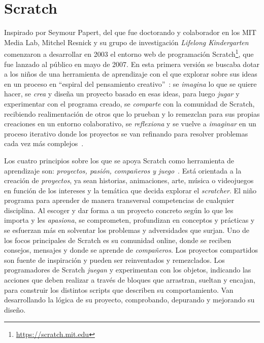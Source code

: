 \documentclass[a4paper, 12pt]{book}
\begin{document}
\section{Scratch}
\label{sec:scratch}

Inspirado por Seymour Papert, del que fue doctorando y colaborador en los MIT Media Lab, Mitchel Resnick y su grupo de investigación \emph{Lifelong Kindergarten} comenzaron a desarrollar en 2003 el entorno web de programación Scratch\footnote{\url{https://scratch.mit.edu}}, que fue lanzado al público en mayo de 2007. En esta primera versión se buscaba dotar a los niños de una herramienta de aprendizaje con el que explorar sobre sus ideas en un proceso en ``espiral del pensamiento creativo''~\cite{resnick2008sowing}: se \emph{imagina} lo que se quiere hacer, se \emph{crea} y diseña un proyecto basado en esas ideas, para luego \emph{jugar} y experimentar con el programa creado, se \emph{comparte} con la comunidad de Scratch, recibiendo realimentación de otros que lo prueban y lo remezclan para sus propias creaciones en un entorno colaborativo, se \emph{reflexiona} y se vuelve a \emph{imaginar} en un proceso iterativo donde los proyectos se van refinando para resolver problemas cada vez más complejos~\cite{resnick2007all}.

Los cuatro principios sobre los que se apoya Scratch como herramienta de aprendizaje son: \textit{proyectos, pasión, compañeros y juego}~\cite{resnick2017seeds}. Está orientada a la creación de \emph{proyectos}, ya sean historias, animaciones, arte, música o videojuegos en función de los intereses y la temática que decida explorar el \emph{scratcher}. El niño programa para aprender de manera transversal competencias de cualquier disciplina. Al escoger y dar forma a un proyecto concreto según lo que les importa y les \emph{apasiona}, se comprometen, profundizan en conceptos y prácticas y se esfuerzan más en solventar los problemas y adversidades que surjan. Uno de los focos principales de Scratch es su comunidad online, donde se reciben consejos, mensajes y donde se aprende de \emph{compañeros}. Los proyectos compartidos son fuente de inspiración y pueden ser reinventados y remezclados. Los programadores de Scratch \emph{juegan} y experimentan con los objetos, indicando las acciones que deben realizar a través de bloques que arrastran, sueltan y encajan, para construir los distintos scripts que describen su comportamiento.
Van desarrollando la lógica de su proyecto, comprobando, depurando y mejorando su diseño.
\end{document}
